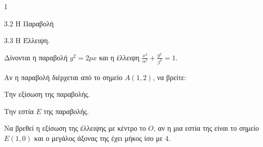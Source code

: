 \begin{ylh}{1}
    \item 3.2 Η Παραβολή
    \item 3.3 Η Έλλειψη.
\end{ylh}
Δίνονται η παραβολή $y^2 = 2px$ και η έλλειψη $\frac{x^2}{\alpha^2} + \frac{y^2}{\beta^2} = 1$.
\begin{alist}
\item Αν η παραβολή διέρχεται από το σημείο $A(1,2)$, να βρείτε:
    \begin{rlist}
    \item Την εξίσωση της παραβολής. 
    \item Την εστία $E$ της παραβολής. 
    \end{rlist}
\item Να βρεθεί η εξίσωση της έλλειψης με κέντρο το $O$, αν η μια εστία της είναι το σημείο $E(1,0)$ και ο μεγάλος άξονας της έχει μήκος ίσο με 4. 
\end{alist}
